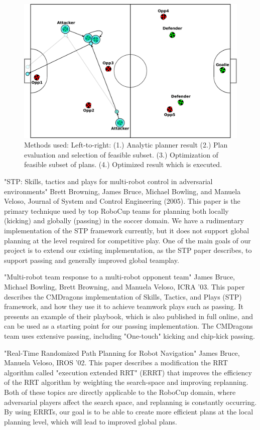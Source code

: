 \documentclass[a4paper, 10pt, conference]{ieeeconf}      %
\begin{document}
\begin{figure}[ht!]
\begin{center}
\includegraphics[totalheight=1.0in]{plan4_resized}
\end{center}
\caption{Methods used: Left-to-right: (1.) Analytic planner result (2.) Plan evaluation and selection of feasible subset. (3.) Optimization of feasible subset of plans. (4.) Optimized result which is executed.}
\end{figure}

"STP: Skills, tactics and plays for multi-robot control in adversarial environments" Brett Browning, James Bruce, Michael Bowling, and Manuela Veloso, Journal of System and Control Engineering (2005). This paper is the primary technique used by top RoboCup teams for planning both locally (kicking) and globally (passing) in the soccer domain. We have a rudimentary implementation of the STP framework currently, but it does not support global planning at the level required for competitive play. One of the main goals of our project is to extend our existing implementation, as the STP paper describes, to support passing and generally improved global teamplay.

"Multi-robot team response to a multi-robot opponent team" James Bruce, Michael Bowling, Brett Browning, and Manuela Veloso, ICRA '03. This paper describes the CMDragons implementation of Skills, Tactics, and Plays (STP) framework, and how they use it to achieve teamwork plays such as passing. It presents an example of their playbook, which is also published in full online, and can be used as a starting point for our passing implementation. The CMDragons team uses extensive passing, including "One-touch" kicking and chip-kick passing.

"Real-Time Randomized Path Planning for Robot Navigation" James Bruce, Manuela Veloso, IROS '02. This paper describes a modification the RRT algorithm called "execution extended RRT" (ERRT) that improves the efficiency of the RRT algorithm by weighting the search-space and improving replanning. Both of these topics are directly applicable to the RoboCup domain, where adversarial players affect the search space, and replanning is constantly occurring. By using ERRTs, our goal is to be able to create more efficient plans at the local planning level, which will lead to improved global plans.
\end{document}
